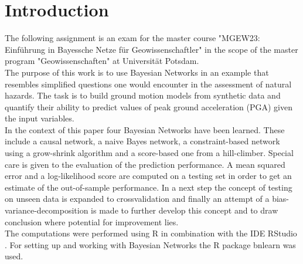 
\chapter{Introduction} %

\label{Chapter1} %

The following assignment is an exam for the master course "MGEW23: Einführung in Bayessche Netze für Geowissenschaftler" in the scope of the master program "Geowissenschaften" at Universität Potsdam.\\
The purpose of this work is to use Bayesian Networks in an example that resembles simplified questions one would encounter in the assessment of natural hazards. The task is to build ground motion models from synthetic data and quantify their ability to predict values of peak ground acceleration (PGA) given the input variables.\\
In the context of this paper four Bayesian Networks have been learned. These include a causal network, a naive Bayes network, a constraint-based network using a grow-shrink algorithm and a score-based one from a hill-climber. Special care is given to the evaluation of the prediction performance. A mean squared error and a log-likelihood score are computed on a testing set in order to get an estimate of the out-of-sample performance. In a next step the concept of testing on unseen data is expanded to crossvalidation and finally an attempt of a bias-variance-decomposition is made to further develop this concept and to draw conclusion where potential for improvement lies.\\
The computations were performed using R \citep{R} in combination with the IDE RStudio \citep{Rstudio}. For setting up and working with Bayesian Networks the R package bnlearn \citep{bnlearn} was used.